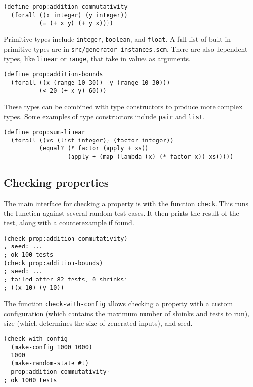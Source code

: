 \documentclass{scrartcl}
\begin{document}
\begin{verbatim}
(define prop:addition-commutativity
  (forall ((x integer) (y integer))
          (= (+ x y) (+ y x))))
\end{verbatim}

Primitive types include \verb|integer|, \verb|boolean|, and \verb|float|. A full
list of built-in primitive types are in \verb|src/generator-instances.scm|.
There are also dependent types, like \verb|linear| or \verb|range|, that take
in values as arguments.

\begin{verbatim}
(define prop:addition-bounds
  (forall ((x (range 10 30)) (y (range 10 30)))
          (< 20 (+ x y) 60)))
\end{verbatim}

These types can be combined with type constructors to produce more complex
types. Some examples of type constructors include \verb|pair| and \verb|list|.

\begin{verbatim}
(define prop:sum-linear
  (forall ((xs (list integer)) (factor integer))
          (equal? (* factor (apply + xs))
                  (apply + (map (lambda (x) (* factor x)) xs)))))
\end{verbatim}

\subsection{Checking properties}
The main interface for checking a property is with the function \verb|check|.
This runs the function against several random test cases. It then prints
the result of the test, along with a counterexample if found.

\begin{verbatim}
(check prop:addition-commutativity)
; seed: ...
; ok 100 tests
(check prop:addition-bounds)
; seed: ...
; failed after 82 tests, 0 shrinks:
; ((x 10) (y 10))
\end{verbatim}

The function \verb|check-with-config| allows checking a property with a custom
configuration (which contains the maximum number of shrinks and tests to run),
size (which determines the size of generated inputs), and seed.

\begin{verbatim}
(check-with-config
  (make-config 1000 1000)
  1000
  (make-random-state #t)
  prop:addition-commutativity)
; ok 1000 tests
\end{verbatim}
\end{document}
